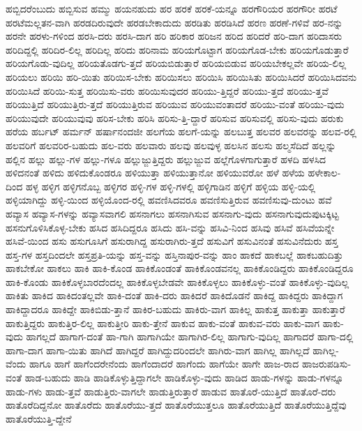 {ಹಬ್ಬಿದರೆಂಬುದು
ಹಬ್ಬಿಸುವ
ಹಮ್ಮು
ಹಯನಹುದು
ಹರ
ಹರಕೆ
ಹರಕೆ-ಯನ್ನೂ
ಹರಗೌರಿಯರ
ಹರಗೌರೀ
ಹರಟೆ
ಹರಟೆಮಲ್ಲತನ-ವಾಗಿ
ಹರಡದಿರುವುದೇ
ಹರಡಬೇಕಾದುದು
ಹರಡಿತು
ಹರಡಿಸಿದೆ
ಹರಣ
ಹರಣೆ-ಗಳಿವೆ
ಹರ-ನನ್ನು
ಹರನೇ
ಹರಳು-ಗಳಿಂದ
ಹರಸಿ-ದರು
ಹರಸಿ-ದಾಗ
ಹರಿ
ಹರಿಕಾರ
ಹರಿಜನ
ಹರಿದ
ಹರಿದರೆ
ಹರಿ-ದಾಗ
ಹರಿದಾಸರು
ಹರಿದಿದ್ದಲ್ಲಿ
ಹರಿದಿರ-ಲಿಲ್ಲ
ಹರಿದಿಲ್ಲ
ಹರಿದು
ಹರಿನಾಮ
ಹರಿಯಗೊಟ್ಟಾಗ
ಹರಿಯಗೊಡ-ಬೇಕು
ಹರಿಯಗೊಡುತ್ತಾರೆ
ಹರಿಯಗೊಡು-ವುದಿಲ್ಲ
ಹರಿಯತೊಡಗು-ತ್ತದೆ
ಹರಿಯಬಿಡುತ್ತಾರೆ
ಹರಿಯಬಿಡುವ
ಹರಿಯಬೇಕಲ್ಲವೇ
ಹರಿಯ-ಲಿಲ್ಲ
ಹರಿಯಲು
ಹರಿಯಿ
ಹರಿ-ಯಿತು
ಹರಿಯಿಸ-ಬೇಕು
ಹರಿಯಿಸಲು
ಹರಿಯಿಸಿ
ಹರಿಯಿಸಿತು
ಹರಿಯಿಸಿದರೆ
ಹರಿಯಿಸಿದವನು
ಹರಿಯಿಸಿದೆ
ಹರಿಯಿ-ಸುತ್ತ
ಹರಿಯಿಸು-ವರು
ಹರಿಯಿಸುವುದರ
ಹರಿಯು-ತ್ತಿದ್ದರೆ
ಹರಿಯು-ತ್ತದೆ
ಹರಿಯು-ತ್ತವೆ
ಹರಿಯುತ್ತಿದೆ
ಹರಿಯುತ್ತಿರು-ತ್ತದೆ
ಹರಿಯುತ್ತಿರುವ
ಹರಿಯುವ
ಹರಿಯುವಂತಾದರೆ
ಹರಿಯು-ವಂತೆ
ಹರಿಯು-ವುದು
ಹರಿಯುವುದೇ
ಹರಿಯುವುವು
ಹರಿಸ-ಬೇಕು
ಹರಿಸಿ
ಹರಿಸು-ತ್ತಿ-ದ್ದಾರೆ
ಹರಿಸುವ
ಹರಿಸುವಲ್ಲಿ
ಹರಿಸು-ವುದು
ಹರುಕು
ಹರೆಯ
ಹರ್ಬಟ್
ಹರ್ಮನ್
ಹರ್ಷಾನಂದಜೀ
ಹಲಗೆಯ
ಹಲಗೆ-ಯನ್ನು
ಹಲಬುತ್ತ
ಹಲವರ
ಹಲವರನ್ನು
ಹಲವ-ರಲ್ಲಿ
ಹಲವರಿಗೆ
ಹಲವರಿರ-ಬಹುದು
ಹಲ-ವರು
ಹಲವಾರು
ಹಲವು
ಹಲವುಳ್ಳ
ಹಲಸಿನ
ಹಲಸು
ಹಲ್ಮಸೆದಿದೆ
ಹಲ್ಲನ್ನು
ಹಲ್ಲಿನ
ಹಲ್ಲು
ಹಲ್ಲು-ಗಳ
ಹಲ್ಲು-ಗಳೂ
ಹಲ್ಲುಜ್ಜುತ್ತಿದ್ದರು
ಹಲ್ಲುಜ್ಜುವ
ಹಲ್ಲೆಗೊಳಗಾಗುತ್ತಾರೆ
ಹಳದಿ
ಹಳಸಿದ
ಹಳಿದನಂತೆ
ಹಳಿದು
ಹಳಿದುಕೊಂಡರೂ
ಹಳಿಯುತ್ತಾ
ಹಳಿಯುತ್ತಾನೋ
ಹಳಿಯುವರೋ
ಹಳೆ
ಹಳೆಯ
ಹಳೇಕಾಲ-ದಿಂದ
ಹಳ್ಳ
ಹಳ್ಳಿಗ
ಹಳ್ಳಿಗನೊಬ್ಬ
ಹಳ್ಳಿಗರ
ಹಳ್ಳಿ-ಗಳ
ಹಳ್ಳಿ-ಗಳಲ್ಲಿ
ಹಳ್ಳಿಗಾಡಿನ
ಹಳ್ಳಿಗೆ
ಹಳ್ಳಿಯ
ಹಳ್ಳಿ-ಯಲ್ಲಿ
ಹಳ್ಳಿಯಾಗಿದ್ದು
ಹಳ್ಳಿ-ಯಿಂದ
ಹಳ್ಳಿಯೊಂದ-ರಲ್ಲಿ
ಹವಣಿಸಿದವರೂ
ಹವಣಿಸುತ್ತಿರುವ
ಹವಣಿಸುವು-ದುಂಟು
ಹವೆ
ಹವ್ಯಾಸ
ಹವ್ಯಾಸ-ಗಳನ್ನು
ಹವ್ಯಾಸವಾಗಲಿ
ಹಸನಾಗಲು
ಹಸನಾಗಿಸುವ
ಹಸನಾಗು-ವುದು
ಹಸನಾಗುವುದುಪುಟಕ್ಕಿಟ್ಟ
ಹಸನುಗೊಳಿಸಿಕೊಳ್ಳ-ಬೇಕು
ಹಸಿದ
ಹಸಿದಿದ್ದರೂ
ಹಸಿದು
ಹಸಿ-ವನ್ನು
ಹಸಿವಿ-ನಿಂದ
ಹಸಿವು
ಹಸಿವೆ
ಹಸಿವೆಯನ್ನೇ
ಹಸಿವೆ-ಯಿಂದ
ಹಸು
ಹಸುಗೂಸಿಗೆ
ಹಸುರಾಗಿದ್ದ
ಹಸುರಾಗಿರು-ತ್ತದೆ
ಹಸುವಿಗೆ
ಹಸುವಿನಂತೆ
ಹಸುವಿನೆದುರು
ಹಸ್ತ
ಹಸ್ತ-ಗಳ
ಹಸ್ತದಿಂದಲೇ
ಹಸ್ತಪ್ರತಿ-ಯನ್ನು
ಹಸ್ತ-ವನ್ನು
ಹಸ್ತಿನಾಪುರ-ವನ್ನು
ಹಾಂ
ಹಾಕದೆ
ಹಾಕಬಲ್ಲೆ
ಹಾಕಬಹುದಿತ್ತು
ಹಾಕಬೇಕೋ
ಹಾಕಲು
ಹಾಕಿ
ಹಾಕಿ-ಕೊಂಡ
ಹಾಕಿಕೊಂಡಂತೆ
ಹಾಕಿಕೊಂಡವನಲ್ಲ
ಹಾಕಿಕೊಂಡಿದ್ದರು
ಹಾಕಿಕೊಂಡಿದ್ದರೂ
ಹಾಕಿ-ಕೊಂಡು
ಹಾಕಿಕೊಳ್ಳಬಾರದೆಂದಲ್ಲ
ಹಾಕಿಕೊಳ್ಳಬೇಡವೇ
ಹಾಕಿಕೊಳ್ಳಲು
ಹಾಕಿಕೊಳ್ಳು-ವಂತೆ
ಹಾಕಿಕೊಳ್ಳು-ವುದಿಲ್ಲ
ಹಾಕಿತು
ಹಾಕಿದ
ಹಾಕಿದಂತಲ್ಲವೇ
ಹಾಕಿ-ದಂತೆ
ಹಾಕಿ-ದರು
ಹಾಕಿದರೆ
ಹಾಕಿದೊಡನೆ
ಹಾಕಿದ್ದ
ಹಾಕಿದ್ದರು
ಹಾಕಿದ್ದಾಗ
ಹಾಕಿದ್ದಾದರೂ
ಹಾಕಿದ್ದೇ
ಹಾಕಿಬಿಡು-ತ್ತಾನೆ
ಹಾಕಿರ-ಬಹುದು
ಹಾಕಿರು-ವಾಗ
ಹಾಕಿಲ್ಲ
ಹಾಕುತ್ತ
ಹಾಕುತ್ತಾ
ಹಾಕುತ್ತಾರೆ
ಹಾಕುತ್ತಿದ್ದರು
ಹಾಕುತ್ತಿರ-ಲಿಲ್ಲ
ಹಾಕುತ್ತೀರಿ
ಹಾಕು-ತ್ತೇನೆ
ಹಾಕುವ
ಹಾಕು-ವಂತೆ
ಹಾಕುವ-ವರು
ಹಾಕು-ವಾಗ
ಹಾಕು-ವುದು
ಹಾಗಲ್ಲದೆ
ಹಾಗಾಗ-ದಂತೆ
ಹಾ-ಗಾಗಿ
ಹಾಗಾಗಿಯೇ
ಹಾಗಾಗಿರ-ಲಿಲ್ಲ
ಹಾಗಾಗು-ವುದಿಲ್ಲ
ಹಾಗಾದರೆ
ಹಾಗಾ-ದಲ್ಲಿ
ಹಾಗಾ-ದಾಗ
ಹಾಗಾ-ಯಿತು
ಹಾಗಿದೆ
ಹಾಗಿದ್ದರೆ
ಹಾಗಿದ್ದುದರಿಂದಲೇ
ಹಾಗಿರು-ವಾಗ
ಹಾಗಿಲ್ಲ
ಹಾಗಿಲ್ಲದೆ
ಹಾಗಿಲ್ಲ-ವೆಂದು
ಹಾಗೂ
ಹಾಗೆ
ಹಾಗೆಂದರೇನೆಂದು
ಹಾಗೆಂದಾದರೆ
ಹಾಗೆಂದು
ಹಾಗೆಯೇ
ಹಾಗೇ
ಹಾಜ-ರಾದ
ಹಾಜರುಪಡಿಸು-ವಂತೆ
ಹಾಡ-ಬಹುದು
ಹಾಡಿ
ಹಾಡಿಕೊಳ್ಳುತ್ತಿದ್ದಾಗಲೇ
ಹಾಡಿಕೊಳ್ಳು-ವುದು
ಹಾಡಿದ
ಹಾಡು-ಗಳನ್ನು
ಹಾಡು-ಗಳನ್ನೂ
ಹಾಡು-ಗಳು
ಹಾಡು-ತ್ತವೆ
ಹಾಡುತ್ತಿರು-ವಾಗಲೇ
ಹಾಡುತ್ತಿರುತ್ತಾರೆ
ಹಾಡುವ
ಹಾತೊರೆ-ಯುತ್ತಿದೆ
ಹಾತೊರೆ-ದರು
ಹಾತೊರೆದಿದ್ದನೋ
ಹಾತೊರೆದು
ಹಾತೊರೆಯು-ತ್ತದೆ
ಹಾತೊರೆಯುತ್ತಲೂ
ಹಾತೊರೆಯುತ್ತಿದೆ
ಹಾತೊರೆಯುತ್ತಿದ್ದೆವು
ಹಾತೊರೆಯುತ್ತಿ-ದ್ದೇನೆ
}
